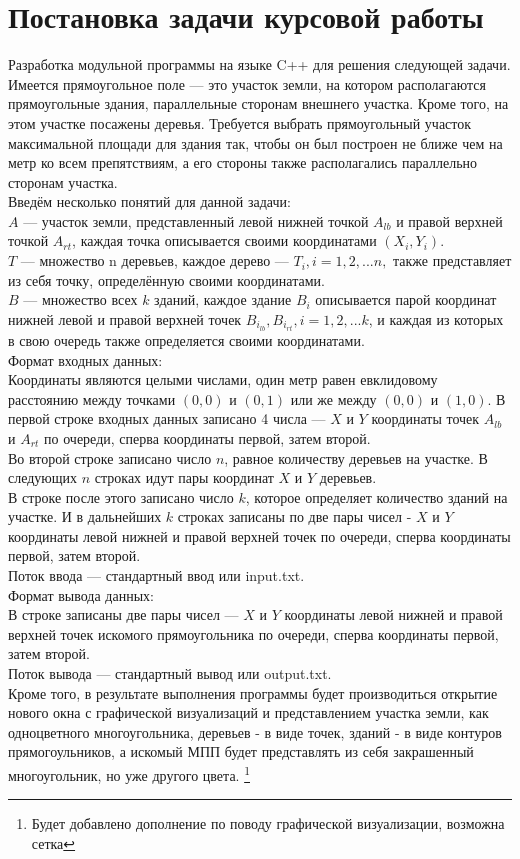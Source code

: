 \documentclass[12pt,a4paper]{article}
\begin{document}
\section{Постановка задачи курсовой работы}{
Разработка модульной программы на языке C++ для решения следующей задачи. Имеется прямоугольное поле — это участок земли, на котором располагаются прямоугольные здания, параллельные сторонам внешнего участка. Кроме того, на этом участке посажены деревья. Требуется выбрать прямоугольный участок максимальной площади для здания так, чтобы он был построен не ближе чем на метр ко всем препятствиям, а его стороны также располагались параллельно сторонам участка. \\
Введём несколько понятий для данной задачи:\\
$A$ — участок земли, представленный левой нижней точкой $A_{lb}$ и правой верхней точкой $A_{rt}$, каждая точка описывается своими координатами $(X_i,Y_i)$. \\$T$ — множество n деревьев, каждое дерево — $T_i, i=1,2,...n,$ также представляет из себя точку, определённую своими координатами.\\ $B$ — множество всех $k$ зданий, каждое здание $B_i$ описывается парой координат нижней левой и правой верхней точек $B_{i_{lb}}, B_{i_{rt}}, i=1,2,...k$,  и каждая из которых в свою очередь также определяется своими координатами.\\
Формат входных данных:\\
Координаты являются целыми числами, один метр равен евклидовому расстоянию между точками $(0,0)$ и $(0,1)$ или же между $(0,0)$ и $(1,0)$.
В первой строке входных данных записано 4 числа — $X$ и $Y$ координаты точек $A_{lb}$ и $A_{rt}$ по очереди, сперва координаты первой, затем второй.\\
Во второй строке записано число $n$, равное количеству деревьев на участке. В следующих $n$ строках идут пары координат $X$ и $Y$ деревьев. \\
В строке после этого записано число $k$, которое определяет количество зданий на участке. И в дальнейших $k$ строках записаны по две пары чисел - $X$ и $Y$ координаты левой нижней и правой верхней точек по очереди, сперва координаты первой, затем второй.\\
Поток ввода — стандартный ввод или input.txt.\\
Формат вывода данных:\\
В строке записаны две пары чисел — $X$ и $Y$ координаты левой нижней и правой верхней точек искомого прямоугольника по очереди, сперва координаты первой, затем второй.\\
Поток вывода — стандартный вывод или output.txt.\\
Кроме того, в результате выполнения программы будет производиться открытие нового окна с графической визуализаций и представлением участка земли, как одноцветного многоугольника, деревьев - в виде точек, зданий - в виде контуров прямогоульников, а искомый МПП будет представлять из себя закрашенный многоугольник, но уже другого цвета.
\footnote{Будет добавлено дополнение по поводу графической визуализации, возможна сетка}
}
\end{document}
